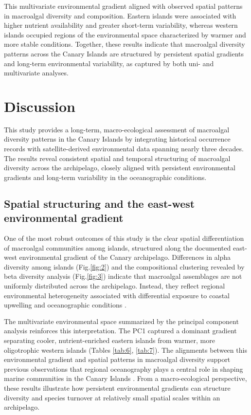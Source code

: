 \documentclass[a4paper,fleqn]{cas-sc}
\begin{document}
This multivariate environmental gradient aligned with observed spatial patterns in macroalgal diversity and composition. Eastern islands were associated with higher nutrient availability and greater short-term variability, whereas western islands occupied regions of the environmental space characterized by warmer and more stable conditions. Together, these results indicate that macroalgal diversity patterns across the Canary Islands are structured by persistent spatial gradients and long-term environmental variability, as captured by both uni- and multivariate analyses.


\section{Discussion}

This study provides a long-term, macro-ecological assessment of macroalgal diversity patterns in the Canary Islands by integrating historical occurrence records with satellite-derived environmental data spanning nearly three decades. The results reveal consistent spatial and temporal structuring of macroalgal diversity across the archipelago, closely aligned with persistent environmental gradients and long-term variability in the oceanographic conditions.

\subsection{Spatial structuring and the east-west environmental gradient}

One of the most robust outcomes of this study is the clear spatial differentiation of macroalgal communities among islands, structured along the documented east-west environmental gradient of the Canary archipelago. Differences in alpha diversity among islands (Fig.\ref{fig:2}) and the compositional clustering revealed by beta diversity analysis (Fig.\ref{fig:3}) indicate that macroalgal assemblages are not uniformly distributed across the archipelago. Instead, they reflect regional environmental heterogeneity associated with differential exposure to coastal upwelling and oceanographic conditions \citep{Barton1998, Aristegui2009}.

The multivariate environmental space summarized by the principal component analysis reinforces this interpretation. The PC1 captured a dominant gradient separating cooler, nutrient-enriched eastern islands from warmer, more oligotrophic western islands (Tables \ref{tab:6}, \ref{tab:7}). The alignments between this environmental gradient and spatial patterns in macroalgal diversity support previous observations that regional oceanography plays a central role in shaping marine communities in the Canary Islands \citep{SANGIL2012, Bianchi2012, Valdazoetal2017}. From a macro-ecological perspective, these results illustrate how persistent environmental gradients can structure diversity and species turnover at relatively small spatial scales within an archipelago.
\end{document}
